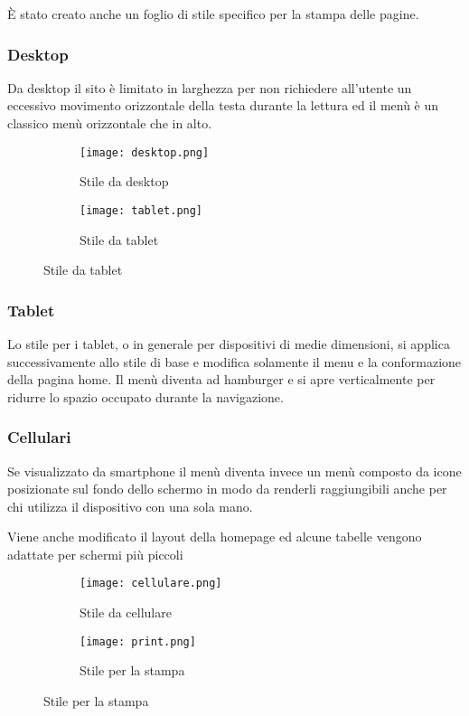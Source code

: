 È stato creato anche un foglio di stile specifico per la stampa delle pagine.

\subsubsection{Desktop}
Da desktop il sito è limitato in larghezza per non richiedere all'utente un eccessivo movimento orizzontale della testa durante la lettura ed il menù è un classico menù orizzontale che in alto.
\begin{figure}[h!]
    \begin{subfigure}{.55\textwidth}
        \centering
        \texttt{[image: desktop.png]}
        \caption{Stile da desktop}
    \end{subfigure} 
    \begin{subfigure}{.4\textwidth}
        \centering
        \texttt{[image: tablet.png]}
        \caption{Stile da tablet}
    \end{subfigure} 
    
\end{figure}

\subsubsection{Tablet}
Lo stile per i tablet, o in generale per dispositivi di medie dimensioni, si applica successivamente allo stile di base e modifica solamente il menu e la conformazione della pagina home.
Il menù diventa ad hamburger e si apre verticalmente per ridurre lo spazio occupato durante la navigazione.

\subsubsection{Cellulari}
Se visualizzato da smartphone il menù diventa invece un menù composto da icone posizionate sul fondo dello schermo in modo da renderli raggiungibili anche per chi utilizza il dispositivo con una sola mano.

Viene anche modificato il layout della homepage ed alcune tabelle vengono adattate per schermi più piccoli
\begin{figure}[h!]
    \begin{subfigure}{.45\textwidth}
        \centering
        \texttt{[image: cellulare.png]}
        \caption{Stile da cellulare}
    \end{subfigure} 
    \begin{subfigure}{.45\textwidth}
        \centering
        \texttt{[image: print.png]}
        \caption{Stile per la stampa}
    \end{subfigure} 
\end{figure}

